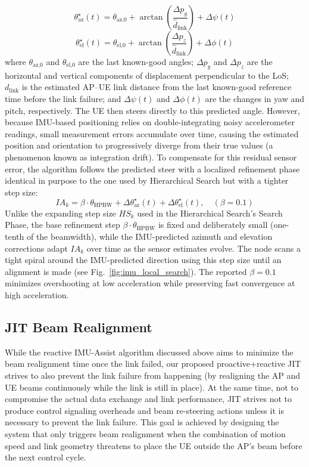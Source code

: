 \documentclass[fleqn,10pt]{wlscirep}
\newcommand{\rev}[1]{{\color{revblue}#1}}
\begin{document}
\begin{equation}
    \theta_{\text{az}}^{\star}(t) = \theta_{\text{az,0}} + \arctan\!\left(\frac{\Delta p_{y}}{\hat{d}_{\text{link}}}\right) + \Delta\psi(t)
\end{equation}
\begin{equation}
    \theta_{\text{el}}^{\star}(t) = \theta_{\text{el,0}} + \arctan\!\left(\frac{\Delta p_{z}}{\hat{d}_{\text{link}}}\right) + \Delta\phi(t)
\end{equation}
where $\theta_{\text{az,0}}$ and $\theta_{\text{el,0}}$ are the last known-good angles; $\Delta p_y$ and $\Delta p_z$ are the horizontal and vertical components of displacement perpendicular to the LoS; $d_{\text{link}}$ is the estimated AP--UE link distance from the last known-good reference time before the link failure; and $\Delta\psi(t)$ and $\Delta\phi(t)$ are the changes in yaw and pitch, respectively. The UE then steers directly to this predicted angle. However, because IMU-based positioning relies on double-integrating noisy accelerometer readings, small measurement errors accumulate over time, causing the estimated position and orientation to progressively diverge from their true values (a phenomenon known as integration drift). To compensate for this residual sensor error, the algorithm follows the predicted steer with a localized refinement phase identical in purpose to the one used by Hierarchical Search but with a tighter step size:
\begin{equation}
    IA_k = \beta \cdot \theta_{\text{HPBW}} + \Delta\theta_{\text{az}}^{\star}(t) + \Delta\theta_{\text{el}}^{\star}(t), \quad (\beta = 0.1)
\end{equation}
Unlike the expanding step size $HS_k$ used in the Hierarchical Search's Search Phase, the base refinement step $\beta \cdot \theta_{\text{HPBW}}$ is fixed and deliberately small (one-tenth of the beamwidth), while the IMU-predicted azimuth and elevation corrections adapt $IA_k$ over time as the sensor estimates evolve. The node scans a tight spiral around the IMU-predicted direction using this step size until an alignment is made (see Fig.~\ref{fig:imu_local_search}). \rev{The reported $\beta = 0.1$ minimizes overshooting at low acceleration while preserving fast convergence at high acceleration.}

\subsection*{JIT Beam Realignment}
While the reactive IMU-Assist algorithm discussed above aims to minimize the beam realignment time once the link failed, our proposed proactive+reactive JIT strives to also prevent the link failure from happening (by realigning the AP and UE beams continuously while the link is still in place). At the same time, not to compromise the actual data exchange and link performance, JIT strives not to produce control signaling overheads and beam re-steering actions unless it is necessary to prevent the link failure. This goal is achieved by designing the system that only triggers beam realignment when the combination of motion speed and link geometry threatens to place the UE outside the AP's beam before the next control cycle.
\end{document}
